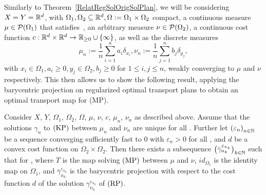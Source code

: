 Similarly to Theorem~\ref{RelatRegSolOrigSolPlan}, we will be considering $X = Y = \R^d$, with $\Omega_1, \Omega_2 \subseteq \R^d, \Omega := \Omega_1 \times \Omega_2$ compact, a continuous measure $\mu \in \PM{\Omega_1}$ that satisfies\ \cite[Corollary~9.3]{Vill2009}, an arbitrary measure $\nu \in \PM{\Omega_2}$, a continuous cost function $\map[c]{\R^d \times \R^d}{\RZero \cup \{ \infty \}}$, as well as the discrete measures
\[ \mu_n := \frac{1}{n} \sum\limits_{i = 1}^n a_i \delta_{x_i}, \nu_n := \frac{1}{n} \sum\limits_{j = 1}^n b_j \delta_{y_j}, \]
with $x_i \in \Omega_1, a_i \ge 0, y_j \in \Omega_2, b_j \ge 0$ for $1 \le i, j \le n$, weakly converging to $\mu$ and $\nu$ respectively. This then allows us to show the following result, applying the barycentric projection on regularized optimal transport plans to obtain an optimal transport map for (MP).

\begin{theorem}\label{RelatRegSolOrigSolMap}
	Consider $X$, $Y$, $\Omega_1$, $\Omega_2$, $\Omega$, $\mu$, $\nu$, $c$, $\mu_n$, $\nu_n$ as described above. Assume that the solutions $\gamma_n$ to$\text{\normalfont\ (KP)}$ between $\mu_n$ and $\nu_n$ are unique for all \NinN. Further let ${(\varepsilon_n)}_{\NinN}$ be a sequence converging sufficiently fast to $0$ with $\varepsilon_n > 0$ for all \NinN, and $d$ be a convex cost function on $\Omega_2 \times \Omega_2$. Then there exists a subsequence ${\big(\bar{\gamma}^{\varepsilon_{n_k}}_{n_k}\big)}_{\NinN[k]}$ such that  for \Ninf, where $T$ is the map solving$\text{\normalfont\ (MP)}$ between $\mu$ and $\nu$, $id_{\Omega_1}$ is the identity map on $\Omega_1$, and $\bar{\gamma}^{\varepsilon_{n_k}}_{n_k}$ is the barycentric projection with respect to the cost function $d$ of the solution $\gamma^{\varepsilon_{n_k}}_{n_k}$ of$\text{\normalfont\ (RP)}$.
\end{theorem}

